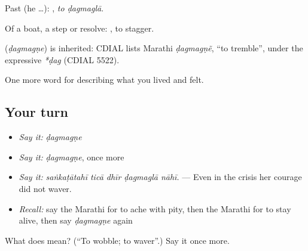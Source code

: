Past (he …):  , \emph{to ḍagmaglā}.

Of a boat, a step or resolve:  , to stagger.

\begin{cousinweb}
\textbf{} (\emph{ḍagmagṇe}) is inherited: CDIAL lists Marathi \emph{ḍagmagṇẽ}, \textquotedblleft{}to tremble\textquotedblright{}, under the expressive \emph{*ḍag} (CDIAL 5522).
\end{cousinweb}

\begin{grammarlens}[title={What you've built}]
One more word for describing what you lived and felt.
\end{grammarlens}

\subsection*{Your turn}
\begin{itemize}
\raggedright
  \item \emph{Say it:} \emph{ḍagmagṇe}
  \item \emph{Say it:} \emph{ḍagmagṇe}, once more
  \item \emph{Say it:} \emph{saṅkaṭātahī ticā dhīr ḍagmaglā nāhī.} — Even in the crisis her courage did not waver.
  \item \emph{Recall:} say the Marathi for to ache with pity, then the Marathi for to stay alive, then say \emph{ḍagmagṇe} again
\end{itemize}

\begin{tcolorbox}[breakable,colback=teal!4,colframe=teal!35!black,title={Before you move on}]
What does  mean? (\textquotedblleft{}To wobble; to waver\textquotedblright{}.) Say it once more.
\end{tcolorbox}
